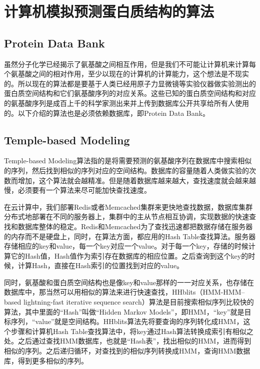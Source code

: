 \documentclass{article}
\begin{document}
\section{计算机模拟预测蛋白质结构的算法}

\subsection{Protein Data Bank}

虽然分子化学已经揭示了氨基酸之间相互作用，但是我们不可能让计算机来计算每个氨基酸之间的相对作用，至少以现在的计算机的计算能力，这个想法是不现实的。所以现在的算法都是要基于人类已经用原子力显微镜等实验仪器做实验测出的蛋白质空间结构和它们氨基酸序列的对应关系。这些已知的蛋白质空间结构和对应的氨基酸序列是成百上千的科学家测出来并上传到数据库公开共享给所有人使用的。以下介绍的算法也是必须依赖数据库，即Protein Data Bank。

\subsection{Temple-based Modeling}

Temple-based Modeling算法指的是将需要预测的氨基酸序列在数据库中搜索相似的序列，然后找到相似的序列对应的空间结构。数据库的容量随着人类做实验的次数而增加，这个算法就会越精准。但是随着数据库越来越大，查找速度就会越来越慢，必须要有一个算法来尽可能加快查找速度。

在云计算中，我们部署Redis或者Memcached集群来更快地查找数据，数据库集群分布式地部署在不同的服务器上，集群中的主从节点相互协调，实现数据的快速查找和数据库整体的稳定。Redis和Memcached为了查找迅速都把数据存储在服务器的内存而不是硬盘上，同时，在算法方面，都应用的Hash Table查找算法。服务器存储相应的key和value，每一个key对应一个value。对于每一个key，存储的时候计算它的Hash值，Hash值作为索引存在数据库的相应位置。之后查询到这个key的时候，计算Hash，直接在Hash索引的位置找到对应的value。

同时，氨基酸和蛋白质空间结构也是像key和value那样的一一对应关系，也存储在数据库中，那当然可以用相似的算法来进行快速查找，HHblits（HMM-HMM–based lightning-fast iterative sequence
search）算法是目前搜索相似序列比较快的算法，其中里面的“Hash”叫做“Hidden  Markov Models”，即HMM，“key”就是目标序列，“value”就是空间结构。HHblits算法先将要查询的序列转化成HMM，这个步骤和计算机Hash Table查找算法中，将key通过Hash算法转换成索引有相似之处。之后通过查找HMM数据库，也就是“Hash表”，找出相似的HMM，进而得到相似的序列。之后递归循环，对查找到的相似序列转换成HMM，查询HMM数据库，得到更多相似的序列。
\end{document}
